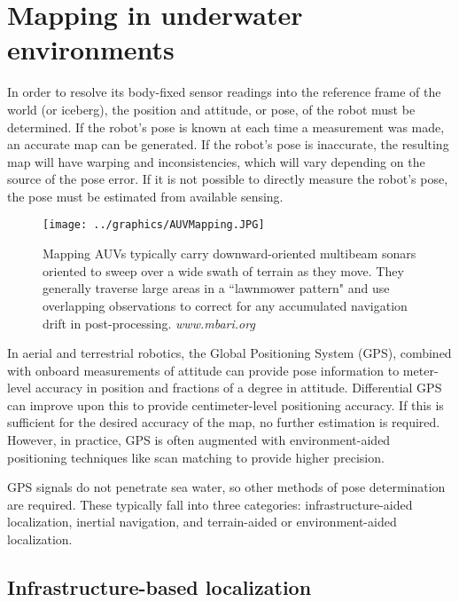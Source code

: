 \section{Mapping in underwater environments}

In order to resolve its body-fixed sensor readings into the reference frame of the world (or iceberg), the position and attitude, or pose, of the robot must be determined. If the robot's pose is known at each time a measurement was made, an accurate map can be generated. If the robot's pose is inaccurate, the resulting map will have warping and inconsistencies, which will vary depending on the source of the pose error. If it is not possible to directly measure the robot's pose, the pose must be estimated from available sensing. 

\begin{figure}[htbp]
   \centering
   \texttt{[image: ../graphics/AUVMapping.JPG]} %
   \caption{Mapping AUVs typically carry downward-oriented multibeam sonars oriented to sweep over a wide swath of terrain as they move. They generally traverse large areas in a ``lawnmower pattern" and use overlapping observations to correct for any accumulated navigation drift in post-processing. \emph{www.mbari.org} }
   \label{fig:AUVbathyMapping}
\end{figure}

In aerial and terrestrial robotics, the Global Positioning System (GPS), combined with onboard measurements of attitude can provide pose information to meter-level accuracy in position and fractions of a degree in attitude. Differential GPS can improve upon this to provide centimeter-level positioning accuracy. If this is sufficient for the desired accuracy of the map, no further estimation is required. However, in practice, GPS is often augmented with environment-aided positioning techniques like scan matching to provide higher precision. \cite{XXX}

GPS  signals do not penetrate sea water, so other methods of pose determination are required. These typically fall into three categories: infrastructure-aided localization, inertial navigation, and terrain-aided or environment-aided localization. 

\subsection{Infrastructure-based localization}

